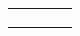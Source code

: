 \begin{table}[!ht]
\begin{tabularx}{\textwidth}{|p{3cm}|K{5cm}|K{3cm}|K{4cm}|}
		&                                                                    &                                                         &                                                                                                                                                                   \\ \hline
		&                                                                    &                                                         &                                                                                                                                                                   \\ \hline
		&                                                                    &                                                         &                                                                                                                                                                   \\ \hline
		&                                                                    &                                                         &                                                                                                                                                                   \\ \hline
	\end{tabularx}
\end{table}




